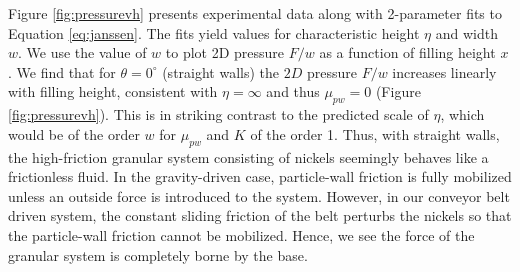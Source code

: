 Figure \ref{fig:pressurevh} presents experimental data along with 2-parameter fits to Equation \ref{eq:janssen}.  The fits yield values for characteristic height $\eta$ and width $w$.  We use the value of $w$ to plot 2D pressure $F/w$ as a function of filling height $x$.  We find that for $\theta = 0^{\circ}$ (straight walls) the $2D$ pressure $F/w$ increases linearly with filling height, consistent with $\eta = \infty$ and thus $\mu_{pw} = 0$ (Figure \ref{fig:pressurevh}). This is in striking contrast to the predicted scale of $\eta$, which would be of the order $w$ for $\mu_{pw}$ and $K$ of the order 1. Thus, with straight walls, the high-friction granular system consisting of nickels seemingly behaves like a frictionless fluid. In the gravity-driven case, particle-wall friction is fully mobilized unless an outside force is introduced to the system. However, in our conveyor belt driven system, the constant sliding friction of the belt perturbs the nickels so that the particle-wall friction cannot be mobilized. Hence, we see the force of the granular system is completely borne by the base. 


